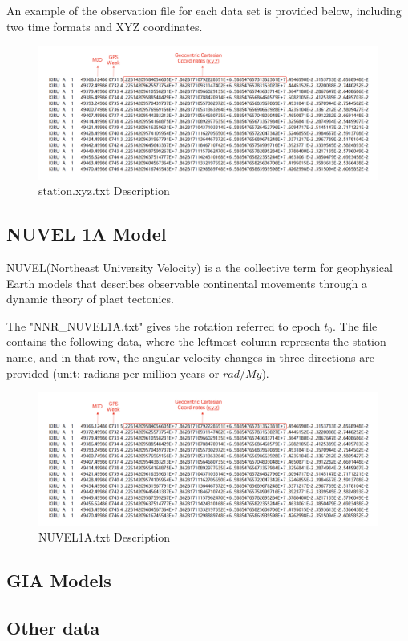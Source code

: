 \documentclass{article}
\begin{document}
An example of the observation file for each data set is provided below, including two time formats and XYZ coordinates.
\begin{figure}[htbp]
    \centering
    \includegraphics[width=12cm]{./source/xyz.png}
    \caption{station.xyz.txt Description}
    \label{fig:XYZ_obs}
\end{figure}
\subsection{NUVEL 1A Model}
NUVEL(Northeast University Velocity) is a the collective term for geophysical Earth models that describes observable
continental movements through a dynamic theory of plaet tectonics.

The "NNR\_NUVEL1A.txt" gives the rotation referred to epoch $t_0$. 
The file contains the following data, where the leftmost column represents the station name, 
and in that row, the angular velocity changes in three directions are provided (unit: radians per million years or $rad/My$).
\begin{figure}[htbp]
    \centering
    \includegraphics[width=12cm]{./source/xyz.png}
    \caption{NUVEL\-1A.txt Description}
    \label{fig:Nuvel-1A}
\end{figure}
\subsection{GIA Models}

\subsection{Other data}
\end{document}
